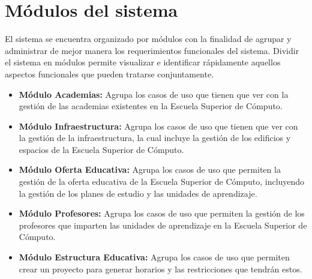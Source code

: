 
\section{Módulos del sistema}

    El sistema se encuentra organizado por módulos con la finalidad de agrupar y administrar de mejor manera los requerimientos funcionales del sistema. Dividir el sistema en módulos permite visualizar e identificar rápidamente aquellos aspectos funcionales que pueden tratarse conjuntamente. \\
%


    \begin{itemize}
    \item {\bf Módulo Academias:} Agrupa los casos de uso que tienen que ver con la gestión de las academias existentes en la Escuela Superior de Cómputo.
	
	\item {\bf Módulo Infraestructura:} Agrupa los casos de uso que tienen que ver con la gestión de la infraestructura, la cual incluye la gestión de los edificios y espacios de la Escuela Superior de Cómputo.

	\item {\bf Módulo Oferta Educativa:} Agrupa los casos de uso que permiten la gestión de la oferta educativa de la Escuela Superior de Cómputo, incluyendo la gestión de los planes de estudio y las unidades de aprendizaje.
    
	\item {\bf Módulo Profesores:} Agrupa los casos de uso que permiten la gestión de los profesores que imparten las unidades de aprendizaje en la Escuela Superior de Cómputo.	

	\item {\bf Módulo Estructura Educativa:} Agrupa los casos de uso que permiten crear un proyecto para generar horarios y las restricciones que tendrán estos. 
	
	\end{itemize}

